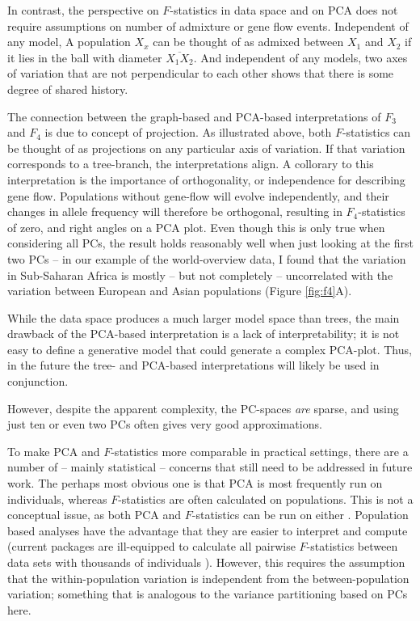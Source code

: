 \documentclass[12pt,a4pape, fullpage]{article}
\begin{document}
In contrast, the perspective on $F$-statistics in data space \citep{oteo-garcia2021} and on PCA does not require assumptions on number of admixture or gene flow events. Independent of any model, A population $X_x$ can be thought of as admixed between $ X_1$ and $X_2$ if it lies in the ball with diameter $\overline{X_1X_2}$. And independent of any models, two axes of variation that are not perpendicular to each other shows that there is some degree of shared history. 

The connection between the graph-based and PCA-based interpretations of $F_3$ and $F_4$ is due to concept of projection. As illustrated above, both $F$-statistics can be thought of as projections on any particular axis of variation. If that variation corresponds to a tree-branch, the interpretations align. A collorary to this interpretation is the importance of orthogonality, or independence for describing gene flow. Populations without gene-flow will evolve independently, and their changes in allele frequency will therefore be orthogonal, resulting in $F_4$-statistics of zero, and right angles on a PCA plot. Even though this is only true when considering all PCs, the result holds reasonably well when just looking at the first two PCs -- in our example of the world-overview data, I found that the variation in Sub-Saharan Africa is mostly -- but not completely -- uncorrelated with the variation between European and Asian populations (Figure \ref{fig:f4}A).

While the data space produces a much larger model space than trees, the main drawback of the PCA-based interpretation is a lack of interpretability; it is not easy to define a generative model that could generate a complex PCA-plot. Thus, in the future the tree- and PCA-based interpretations will likely be used in conjunction. 

 However, despite the apparent complexity, the PC-spaces \emph{are} sparse, and using just ten or even two PCs often gives very good approximations.






To make PCA and $F$-statistics more comparable in practical settings, there are a number of -- mainly statistical -- concerns that still need to be addressed in future work. The perhaps most obvious one is that PCA is most frequently run on individuals, whereas $F$-statistics are often calculated on populations. This is not a conceptual issue, as both PCA and $F$-statistics can be run on either \citep{cavalli-sforza1994}. Population based analyses have the advantage that they are easier to interpret and compute (current packages are ill-equipped to calculate all pairwise $F$-statistics between data sets with thousands of individuals \citep{patterson2012}). However, this requires the assumption that the within-population variation is independent from the between-population variation; something that is analogous to the variance partitioning based on PCs here. 
\end{document}
